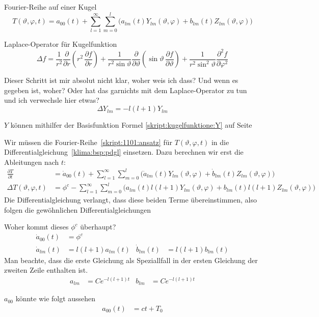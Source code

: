\begin{refsection}
Fourier-Reihe auf einer Kugel
\begin{equation}
T(\vartheta ,\varphi ,t)
=
a_{00}(t) + \sum_{l=1}^\infty\sum_{m=0}^l \bigl( a_{lm}(t)Y_{lm}(\vartheta ,\varphi)+b_{lm}(t)Z_{lm}(\vartheta ,\varphi)\bigr)
\end{equation}

Laplace-Operator für Kugelfunktion
\begin{equation}
\Delta f = \frac{1}{r^2} \frac{\partial}{\partial r} \left( r^2 \,\frac{\partial f}{\partial r} \right) + \frac{1}{r^2 \sin \vartheta} \frac{\partial}{\partial \vartheta} \left(\sin\vartheta \, \frac{\partial f}{\partial \vartheta} \right) + \frac{1}{r^2 \sin^2\vartheta} \frac{\partial^2 f}{\partial \varphi^2}
\end{equation}

Dieser Schritt ist mir absolut nicht klar, woher weis ich dass? Und wenn es gegeben ist, woher? Oder hat das garnichts mit dem Laplace-Operator zu tun und ich verwechsle hier etwas?
\begin{equation}
\Delta Y_{lm}=-l(l+1)Y_{lm}
\end{equation}

$Y$ können mithilfer der Basisfunktion Formel \ref{skript:kugelfunktione:Y} auf Seite \pageref{skript:kugelfunktione:Y}





Wir müssen die Fourier-Reihe~\eqref{skript:1101:ansatz} für
$T(\vartheta ,\varphi ,t)$ in die Differentialgleichung~\eqref{klima:bsp:pdgl}
einsetzen.
Dazu berechnen wir erst die Ableitungen nach $t$:
\begin{align*}
\frac{\partial T}{\partial t} &=
\dot{a}_{00}(t)+\sum_{l=1}^\infty\sum_{m=0}^l \bigl( \dot{a}_{lm}(t)Y_{lm}(\vartheta ,\varphi)+\dot{b}_{lm}(t)Z_{lm}(\vartheta ,\varphi)\bigr)
\\
\Delta T(\vartheta ,\varphi ,t) &=
\phi^c - \sum_{l=1}^\infty\sum_{m=0}^l \bigl( a_{lm}(t)l(l+1)Y_{lm}(\vartheta ,\varphi)+b_{lm}(t)l(l+1)Z_{lm}(\vartheta ,\varphi)\bigr)
\end{align*}
Die Differentialgleichung verlangt, dass diese beiden Terme übereinstimmen,
also folgen die gewöhnlichen Differentialgleichungen

Woher kommt dieses $\phi^c$ überhaupt?
\begin{align*}
\dot a_{00}(t)&=\phi^c
\\
\dot a_{lm}(t)&=l(l+1)a_{lm}(t)&
\dot b_{lm}(t)&=l(l+1)b_{lm}(t)
\end{align*}
Man beachte, dass die erste Gleichung als Speziallfall in der ersten
Gleichung der zweiten Zeile enthalten ist.
\begin{align*}
a_{lm} &=Ce^{-l(l+1)t}&
b_{lm} &=Ce^{-l(l+1)t}
\end{align*}

$a_{00}$ könnte wie folgt aussehen
\begin{align*}
a_{00}(t)&=ct+T_0
\end{align*}









\printbibliography[heading=subbibliography]
\end{refsection}